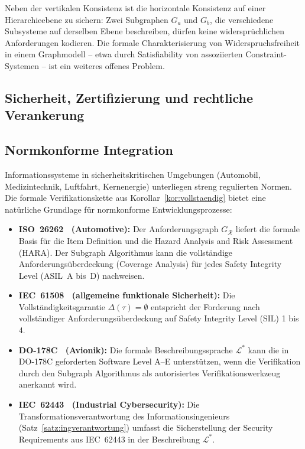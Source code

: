 ﻿\documentclass[a4paper,12pt]{report}
\theoremstyle{definition}
\begin{document}
Neben der vertikalen Konsistenz ist die horizontale Konsistenz auf einer Hierarchieebene
zu sichern: Zwei Subgraphen $G_a$ und $G_b$, die verschiedene Subsysteme auf derselben
Ebene beschreiben, dürfen keine widersprüchlichen Anforderungen kodieren. Die formale
Charakterisierung von Widerspruchsfreiheit in einem Graphmodell -- etwa durch
Satisfiability von assoziierten Constraint-Systemen -- ist ein weiteres offenes Problem.

\subsection{Sicherheit, Zertifizierung und rechtliche Verankerung}

\subsection{Normkonforme Integration}

Informationssysteme in sicherheitskritischen Umgebungen (Automobil, Medizintechnik,
Luftfahrt, Kernenergie) unterliegen streng regulierten Normen.
Die formale Verifikationskette aus Korollar~\ref{kor:vollstaendig} bietet eine
natürliche Grundlage für normkonforme Entwicklungsprozesse:

\begin{itemize}
  \item \textbf{ISO~26262~\cite{iso26262} (Automotive):}
        Der Anforderungsgraph $G_\mathcal{R}$ liefert die formale Basis für die
        Item Definition und die Hazard Analysis and Risk Assessment (HARA).
        Der Subgraph Algorithmus kann die vollständige Anforderungsüberdeckung
        (Coverage Analysis) für jedes Safety Integrity Level (ASIL~A bis~D) nachweisen.
  \item \textbf{IEC~61508~\cite{iec61508} (allgemeine funktionale Sicherheit):}
        Die Vollständigkeitsgarantie $\Delta(\tau) = \emptyset$ entspricht der
        Forderung nach vollständiger Anforderungsüberdeckung auf Safety Integrity
        Level (SIL) 1 bis 4.
  \item \textbf{DO-178C~\cite{do178c} (Avionik):}
        Die formale Beschreibungssprache $\mathcal{L}^*$ kann die in DO-178C
        geforderten Software Level A--E unterstützen, wenn die Verifikation durch
        den Subgraph Algorithmus als autorisiertes Verifikationswerkzeug anerkannt wird.
  \item \textbf{IEC~62443~\cite{iec62443} (Industrial Cybersecurity):}
        Die Transformationsverantwortung des Informationsingenieurs (Satz~\ref{satz:ingverantwortung})
        umfasst die Sicherstellung der Security Requirements aus IEC~62443 in der
        Beschreibung $\mathcal{L}^*$.
\end{itemize}
\end{document}

